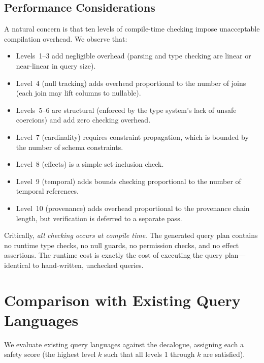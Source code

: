 \documentclass[11pt,a4paper]{article}
\begin{document}
\subsection{Performance Considerations}

A natural concern is that ten levels of compile-time checking impose
unacceptable compilation overhead.  We observe that:

\begin{itemize}[nosep]
  \item Levels~1--3 add negligible overhead (parsing and type checking
    are linear or near-linear in query size).
  \item Level~4 (null tracking) adds overhead proportional to the
    number of joins (each join may lift columns to nullable).
  \item Levels~5--6 are structural (enforced by the type system's
    lack of unsafe coercions) and add zero checking overhead.
  \item Level~7 (cardinality) requires constraint propagation, which
    is bounded by the number of schema constraints.
  \item Level~8 (effects) is a simple set-inclusion check.
  \item Level~9 (temporal) adds bounds checking proportional to the
    number of temporal references.
  \item Level~10 (provenance) adds overhead proportional to the
    provenance chain length, but verification is deferred to a
    separate pass.
\end{itemize}

Critically, \emph{all checking occurs at compile time}.  The generated
query plan contains no runtime type checks, no null guards, no
permission checks, and no effect assertions.  The runtime cost is
exactly the cost of executing the query plan---identical to hand-written,
unchecked queries.

\section{Comparison with Existing Query Languages}\label{sec:comparison}

We evaluate existing query languages against the decalogue, assigning
each a safety score (the highest level $k$ such that all levels
1 through $k$ are satisfied).
\end{document}
